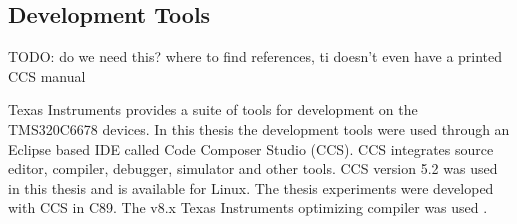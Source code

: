 \subsection{Development Tools}
\label{subsec:devtools}
TODO: do we need this? where to find references, ti doesn't even have a printed
CCS manual


Texas Instruments provides a suite of tools for development on the TMS320C6678
devices. In this thesis the development tools were used through an Eclipse based
IDE called Code Composer Studio (CCS). CCS integrates source editor, compiler,
debugger, simulator and other tools. CCS version 5.2 was used in this thesis 
and is available for Linux. \cite{ccspage} The thesis experiments were developed
with CCS in C89. The v8.x Texas Instruments optimizing compiler was used
\cite{compilerguide}.
